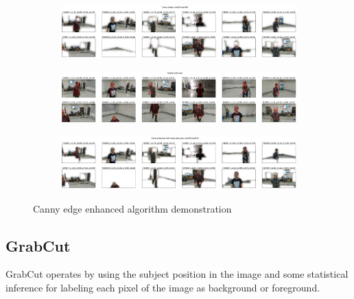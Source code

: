 \begin{figure}[!h]
	\begin{center}
		\begin{subfigure}[h]{1\textwidth}
			\centering
			\includegraphics[width=1\textwidth]{"contents/images/04-1canny-enhance-1"}
		\end{subfigure}
		\vfill
		\begin{subfigure}[h]{1\textwidth}
			\centering
			\includegraphics[width=1\textwidth]{"contents/images/04-1canny-enhance-2"}
		\end{subfigure}
		\vfill
		\begin{subfigure}[h]{1\textwidth}
			\centering
			\includegraphics[width=1\textwidth]{"contents/images/04-1canny-enhance-3"}
		\end{subfigure}
	\end{center}
	\vspace{-0.5cm}
	\caption[Canny edge enhanced algorithm demonstration]{Canny edge enhanced algorithm demonstration}
	\label{fig:canny-enanhced}
\end{figure}



\subsection{GrabCut}
\label{subsec:masking-grabcut}

GrabCut \cite{grabcut2004} operates by using the subject position in the image and some statistical inference for labeling each pixel of the image as background or foreground. 

